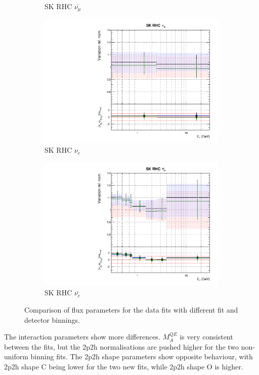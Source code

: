 \begin{figure}
\begin{subfigure}{0.24\textwidth}
  \caption{SK RHC $\bar{\nu_{\mu}}$}
\end{subfigure}
\begin{subfigure}{0.24\textwidth}
  \centering
  \includegraphics[width=0.95\linewidth]{figs/polydataflux_14}
  \caption{SK RHC $\nu_{e}$}
\end{subfigure}
\begin{subfigure}{0.24\textwidth}
  \centering
  \includegraphics[width=0.95\linewidth]{figs/polydataflux_15}
  \caption{SK RHC $\bar{\nu_e}$}
\end{subfigure}
\caption{Comparison of flux parameters for the data fits with different fit and detector binnings.}
\label{fig:polydataflux}
\end{figure}

The interaction parameters show more differences. $M_A^{QE}$ is very consistent between the fits, but the 2p2h normalisations are pushed higher for the two non-uniform binning fits. The 2p2h shape parameters show opposite behaviour, with 2p2h shape C being lower for the two new fits, while 2p2h shape O is higher.


